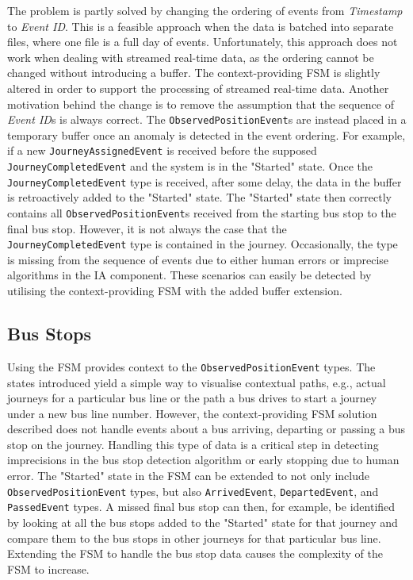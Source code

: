The problem is partly solved by changing the ordering of events from \textit{Timestamp} to \textit{Event ID}.
This is a feasible approach when the data is batched into separate files, where one file is a full day of events.
Unfortunately, this approach does not work when dealing with streamed real-time data, as the ordering cannot be changed without introducing a buffer.
The context-providing FSM is slightly altered in order to support the processing of streamed real-time data.
Another motivation behind the change is to remove the assumption that the sequence of \textit{Event ID}s is always correct. 
The \texttt{ObservedPositionEvent}s are instead placed in a temporary buffer once an anomaly is detected in the event ordering.
For example, if a new \texttt{JourneyAssignedEvent} is received before the supposed \texttt{JourneyCompletedEvent} and the system is in the "Started" state.
Once the \texttt{JourneyCompletedEvent} type is received, after some delay, the data in the buffer is retroactively added to the "Started" state.
The "Started" state then correctly contains all \texttt{ObservedPositionEvent}s received from the starting bus stop to the final bus stop.
However, it is not always the case that the \texttt{JourneyCompletedEvent} type is contained in the journey.
Occasionally, the type is missing from the sequence of events due to either human errors or imprecise algorithms in the IA component.
These scenarios can easily be detected by utilising the context-providing FSM with the added buffer extension.

\subsection{Bus Stops}
Using the FSM provides context to the \texttt{ObservedPositionEvent} types.
The states introduced yield a simple way to visualise contextual paths, e.g., actual journeys for a particular bus line or the path a bus drives to start a journey under a new bus line number.
However, the context-providing FSM solution described does not handle events about a bus arriving, departing or passing a bus stop on the journey.
Handling this type of data is a critical step in detecting imprecisions in the bus stop detection algorithm or early stopping due to human error.
The "Started" state in the FSM can be extended to not only include \texttt{ObservedPositionEvent} types, but also \texttt{ArrivedEvent}, \texttt{DepartedEvent}, and \texttt{PassedEvent} types.
A missed final bus stop can then, for example, be identified by looking at all the bus stops added to the "Started" state for that journey and compare them to the bus stops in other journeys for that particular bus line.
Extending the FSM to handle the bus stop data causes the complexity of the FSM to increase.

